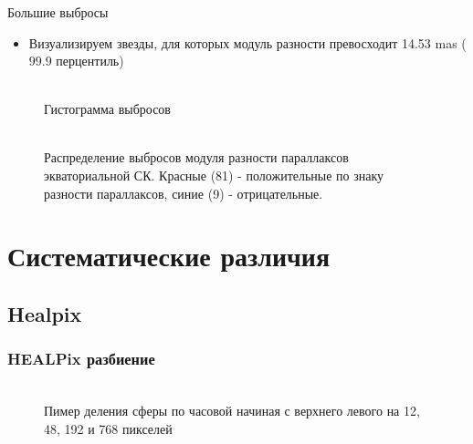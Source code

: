 \documentclass[12pt,aspectratio=43]{beamer}
\begin{document}
\begin{frame}
\frametitle{}
\begin{block}{ Большие выбросы}
\begin{itemize}
  \item[  ] Визуализируем звезды, для которых модуль разности превосходит 14.53 mas ($99.9$ перцентиль)
\end{itemize}
\end{block}

\begin{figure}[h!]
\\{Гистограмма выбросов}
\end{figure}
\end{frame}

\begin{frame}[<alignment>]
\begin{figure}[h!]
\center{\texttt{[image: h75ra]}}\\{Распределение выбросов модуля разности параллаксов экваториальной СК. Красные (81) - положительные по знаку разности параллаксов, синие (9) - отрицательные.}
\end{figure}
\end{frame}


\section{Систематические различия}\label{sistem}

\subsection{Healpix}%
\begin{frame}[<alignment>]
\frametitle{HEALPix разбиение}

\begin{figure}[h!]
\\{Пимер деления сферы по часовой начиная с верхнего левого на 12, 48, 192 и 768 пикселей}
\label{img:healpix}
\end{figure}

\end{frame}	
\end{document}
